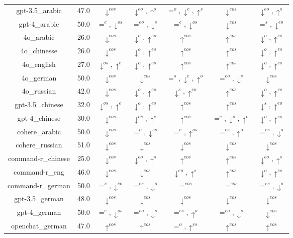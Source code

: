 \documentclass{article}
\begin{document}
\begin{table}
\begin{tabular}{ccccccc}
gpt-3.5\_arabic & 47.0 & $\downarrow^{eos}$ & $\downarrow^{eo},\uparrow^{s}$ & $=^{o},\downarrow^{e},\uparrow^{s}$ & $\downarrow^{eos}$ & $\downarrow^{eo},\uparrow^{s}$ \\
gpt-4\_arabic & 50.0 & $=^{e},\downarrow^{os}$ & $=^{eo},\downarrow^{s}$ & $=^{e},\downarrow^{os}$ & $\downarrow^{eos}$ & $=^{s},\downarrow^{eo}$ \\
4o\_arabic & 26.0 & $\downarrow^{eos}$ & $\downarrow^{o},\uparrow^{es}$ & $\uparrow^{eos}$ & $\uparrow^{eos}$ & $\downarrow^{o},\uparrow^{es}$ \\
4o\_chinesse & 26.0 & $\downarrow^{eos}$ & $\downarrow^{o},\uparrow^{es}$ & $\uparrow^{eos}$ & $\uparrow^{eos}$ & $\downarrow^{o},\uparrow^{es}$ \\
4o\_english & 27.0 & $\downarrow^{os},\uparrow^{e}$ & $\downarrow^{o},\uparrow^{es}$ & $\uparrow^{eos}$ & $\uparrow^{eos}$ & $\downarrow^{o},\uparrow^{es}$ \\
4o\_german & 50.0 & $\downarrow^{eos}$ & $\downarrow^{eos}$ & $=^{s},\downarrow^{e},\uparrow^{o}$ & $=^{eo},\downarrow^{s}$ & $\downarrow^{eos}$ \\
4o\_russian & 42.0 & $\downarrow^{eos}$ & $\downarrow^{o},\uparrow^{es}$ & $\downarrow^{s},\uparrow^{eo}$ & $\uparrow^{eos}$ & $\downarrow^{o},\uparrow^{es}$ \\
gpt-3.5\_chinese & 32.0 & $\downarrow^{os},\uparrow^{e}$ & $\downarrow^{o},\uparrow^{es}$ & $\uparrow^{eos}$ & $\uparrow^{eos}$ & $\downarrow^{s},\uparrow^{eo}$ \\
gpt-4\_chinese & 30.0 & $\downarrow^{eos}$ & $\downarrow^{os},\uparrow^{e}$ & $\uparrow^{eos}$ & $=^{e},\downarrow^{s},\uparrow^{o}$ & $\downarrow^{o},\uparrow^{es}$ \\
cohere\_arabic & 50.0 & $\downarrow^{eos}$ & $=^{o},\downarrow^{es}$ & $=^{e},\uparrow^{os}$ & $=^{es},\uparrow^{o}$ & $=^{es},\downarrow^{o}$ \\
cohere\_russian & 51.0 & $\downarrow^{eos}$ & $\downarrow^{eos}$ & $\downarrow^{eos}$ & $\downarrow^{eos}$ & $\downarrow^{eos}$ \\
command-r\_chinese & 25.0 & $\downarrow^{eos}$ & $\downarrow^{eo},\uparrow^{s}$ & $\uparrow^{eos}$ & $\uparrow^{eos}$ & $\downarrow^{eo},\uparrow^{s}$ \\
command-r\_eng & 46.0 & $\downarrow^{eos}$ & $\downarrow^{eos}$ & $\downarrow^{eo},\uparrow^{s}$ & $\uparrow^{eos}$ & $\downarrow^{o},\uparrow^{es}$ \\
command-r\_german & 50.0 & $=^{s},\downarrow^{eo}$ & $=^{es},\downarrow^{o}$ & $=^{eos}$ & $=^{eos}$ & $=^{es},\downarrow^{o}$ \\
gpt-3.5\_german & 48.0 & $\downarrow^{eos}$ & $\downarrow^{eos}$ & $\downarrow^{eos}$ & $\downarrow^{eos}$ & $\downarrow^{eos}$ \\
gpt-4\_german & 50.0 & $=^{e},\downarrow^{os}$ & $=^{eo},\downarrow^{s}$ & $=^{es},\uparrow^{o}$ & $=^{eo},\downarrow^{s}$ & $\downarrow^{eos}$ \\
openchat\_german & 47.0 & $\uparrow^{eos}$ & $\uparrow^{eos}$ & $=^{o},\uparrow^{es}$ & $\uparrow^{eos}$ & $\uparrow^{eos}$ \\


\end{tabular}
\end{table}
\end{document}
